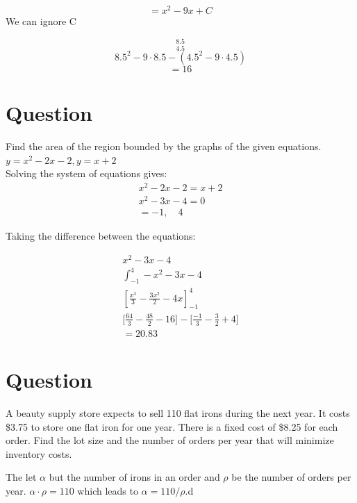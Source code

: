 \documentclass[12pt]{article}
\begin{document}
\begin{equation}
  =x^2 - 9x +C
\end{equation}
We can ignore C

\begin{equation}
  [x^2 - 9x]_{4.5}^{8.5}
\end{equation}
\begin{equation}
  8.5^2 - 9 \cdot 8.5 - (4.5^2 - 9 \cdot 4.5)
\end{equation}
\begin{equation}
  = 16
\end{equation}

\section{Question}
\label{sec:q4}

Find the area of the region bounded by the graphs of the given equations.
$y = x^2- 2x- 2, y = x + 2$
\\

Solving the system of equations gives:
\begin{align*}
  x^2-2x-2=x+2
  \\
  x^2-3x - 4 = 0
  \\
  = -1, \quad 4
\end{align*}

Taking the difference between the equations:

\begin{align*}
  x^2-3x - 4
  \\
  \int_{-1}^4 -x^2-3x - 4
  \\
  [\frac{x^3}{3}- \frac{3x^2}{2} - 4x]_{-1}^4
  \\
  \bigg[\frac{64}{3}- \frac{48}{2} - 16 \bigg] - \bigg[\frac{-1}{3}- \frac{3}{2} +4\bigg]
  \\
  =20.83
\end{align*}

\section{Question}
\label{sec:q5}

A beauty supply store expects to sell 110 flat irons during the next year. It
costs \$3.75 to store one flat iron for one year.  There is a fixed cost of
\$8.25 for each order. Find the lot size and the number of orders per year that
will minimize inventory costs.


The let $\alpha$ but the number of irons in an order and $\rho$ be the number of
orders per year. $\alpha \cdot \rho = 110$ which leads to $\alpha = 110/\rho$.d
\end{document}
